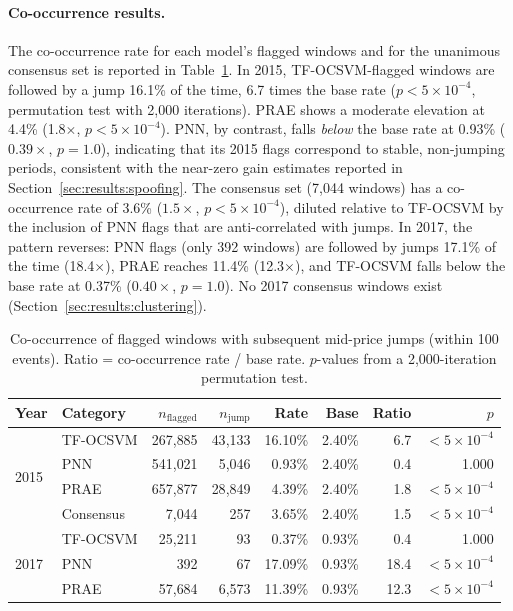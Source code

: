 \documentclass[11pt]{report}
\begin{document}
\paragraph{Co-occurrence results.}
The co-occurrence rate for each model's flagged windows and for the unanimous consensus set is reported in Table~\ref{tab:jump_cooc}. In 2015, TF-OCSVM-flagged windows are followed by a jump 16.1\% of the time, 6.7 times the base rate ($p < 5 \times 10^{-4}$, permutation test with 2{,}000 iterations). PRAE shows a moderate elevation at 4.4\% (1.8$\times$, $p < 5 \times 10^{-4}$). PNN, by contrast, falls \emph{below} the base rate at 0.93\% ($0.39\times$, $p = 1.0$), indicating that its 2015 flags correspond to stable, non-jumping periods, consistent with the near-zero gain estimates reported in Section~\ref{sec:results:spoofing}. The consensus set (7{,}044 windows) has a co-occurrence rate of 3.6\% ($1.5\times$, $p < 5 \times 10^{-4}$), diluted relative to TF-OCSVM by the inclusion of PNN flags that are anti-correlated with jumps. In 2017, the pattern reverses: PNN flags (only 392 windows) are followed by jumps 17.1\% of the time (18.4$\times$), PRAE reaches 11.4\% (12.3$\times$), and TF-OCSVM falls below the base rate at 0.37\% ($0.40\times$, $p = 1.0$). No 2017 consensus windows exist (Section~\ref{sec:results:clustering}).

\begin{table}[H]
\centering
\small
\caption{Co-occurrence of flagged windows with subsequent mid-price jumps (within 100 events). Ratio = co-occurrence rate / base rate. $p$-values from a 2{,}000-iteration permutation test.}
\label{tab:jump_cooc}
\begin{tabular}{llrrrrrr}
\toprule
Year & Category & $n_{\text{flagged}}$ & $n_{\text{jump}}$ & Rate & Base & Ratio & $p$ \\
\midrule
\multirow{4}{*}{2015}
 & TF-OCSVM  & 267{,}885 & 43{,}133 & 16.10\% & 2.40\% & 6.7 & ${<}5{\times}10^{-4}$ \\
 & PNN       & 541{,}021 &  5{,}046 &  0.93\% & 2.40\% & 0.4 & 1.000 \\
 & PRAE      & 657{,}877 & 28{,}849 &  4.39\% & 2.40\% & 1.8 & ${<}5{\times}10^{-4}$ \\
 & Consensus &   7{,}044 &     257  &  3.65\% & 2.40\% & 1.5 & ${<}5{\times}10^{-4}$ \\
\midrule
\multirow{3}{*}{2017}
 & TF-OCSVM  & 25{,}211 &    93 &  0.37\% & 0.93\% & 0.4 & 1.000 \\
 & PNN       &      392 &    67 & 17.09\% & 0.93\% & 18.4 & ${<}5{\times}10^{-4}$ \\
 & PRAE      & 57{,}684 & 6{,}573 & 11.39\% & 0.93\% & 12.3 & ${<}5{\times}10^{-4}$ \\
\bottomrule
\end{tabular}
\end{table}
\end{document}
